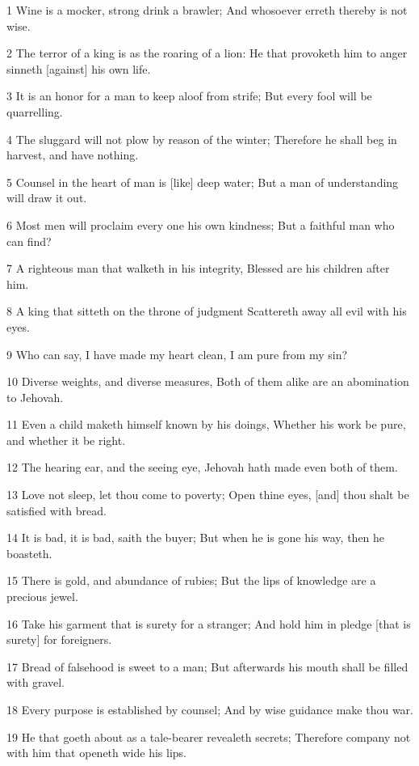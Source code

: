 \par 1 Wine is a mocker, strong drink a brawler; And whosoever erreth thereby is not wise.
\par 2 The terror of a king is as the roaring of a lion: He that provoketh him to anger sinneth [against] his own life.
\par 3 It is an honor for a man to keep aloof from strife; But every fool will be quarrelling.
\par 4 The sluggard will not plow by reason of the winter; Therefore he shall beg in harvest, and have nothing.
\par 5 Counsel in the heart of man is [like] deep water; But a man of understanding will draw it out.
\par 6 Most men will proclaim every one his own kindness; But a faithful man who can find?
\par 7 A righteous man that walketh in his integrity, Blessed are his children after him.
\par 8 A king that sitteth on the throne of judgment Scattereth away all evil with his eyes.
\par 9 Who can say, I have made my heart clean, I am pure from my sin?
\par 10 Diverse weights, and diverse measures, Both of them alike are an abomination to Jehovah.
\par 11 Even a child maketh himself known by his doings, Whether his work be pure, and whether it be right.
\par 12 The hearing ear, and the seeing eye, Jehovah hath made even both of them.
\par 13 Love not sleep, let thou come to poverty; Open thine eyes, [and] thou shalt be satisfied with bread.
\par 14 It is bad, it is bad, saith the buyer; But when he is gone his way, then he boasteth.
\par 15 There is gold, and abundance of rubies; But the lips of knowledge are a precious jewel.
\par 16 Take his garment that is surety for a stranger; And hold him in pledge [that is surety] for foreigners.
\par 17 Bread of falsehood is sweet to a man; But afterwards his mouth shall be filled with gravel.
\par 18 Every purpose is established by counsel; And by wise guidance make thou war.
\par 19 He that goeth about as a tale-bearer revealeth secrets; Therefore company not with him that openeth wide his lips.
